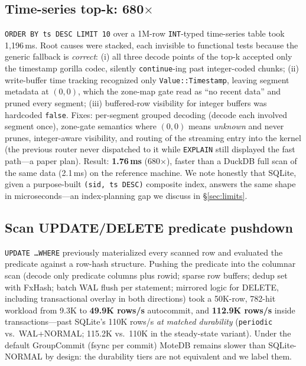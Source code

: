 \documentclass[10pt]{article}
\begin{document}
\subsection{Time-series top-k: 680$\times$}
\label{sec:cases:k1}
\texttt{ORDER BY ts DESC LIMIT 10} over a 1M-row \texttt{INT}-typed
time-series table took 1{,}196\,ms. Root causes were stacked, each invisible
to functional tests because the generic fallback is \emph{correct}: (i) all
three decode points of the top-k accepted only the timestamp gorilla codec,
silently \texttt{continue}-ing past integer-coded chunks; (ii) write-buffer
time tracking recognized only \texttt{Value::Timestamp}, leaving segment
metadata at $(0,0)$, which the zone-map gate read as ``no recent data'' and
pruned every segment; (iii) buffered-row visibility for integer buffers was
hardcoded \texttt{false}. Fixes: per-segment grouped decoding (decode each
involved segment once), zone-gate semantics where $(0,0)$ means
\emph{unknown} and never prunes, integer-aware visibility, and routing of
the streaming entry into the kernel (the previous router never dispatched
to it while \texttt{EXPLAIN} still displayed the fast path---a paper plan).
Result: \textbf{1.76\,ms} (680$\times$), faster than a DuckDB full scan of
the same data (2.1\,ms) on the reference machine. We note honestly that
SQLite, given a purpose-built \texttt{(sid, ts DESC)} composite index,
answers the same shape in microseconds---an index-planning gap we discuss
in \S\ref{sec:limits}.

\subsection{Scan UPDATE/DELETE predicate pushdown}
\label{sec:cases:c1}
\texttt{UPDATE \ldots WHERE} previously materialized every scanned row and
evaluated the predicate against a row-hash structure. Pushing the predicate
into the columnar scan (decode only predicate columns plus rowid; sparse
row buffers; dedup set with FxHash; batch WAL flush per statement; mirrored
logic for DELETE, including transactional overlay in both directions) took
a 50K-row, 782-hit workload from 9.3K to \textbf{49.9K rows/s}
autocommit, and \textbf{112.9K rows/s} inside transactions---past SQLite's
110K rows/s \emph{at matched durability} (\texttt{periodic} vs.\ WAL+NORMAL;
115.2K vs.\ 110K in the steady-state variant). Under the default
GroupCommit (fsync per commit) MoteDB remains slower than SQLite-NORMAL by
design: the durability tiers are not equivalent and we label them.
\end{document}
